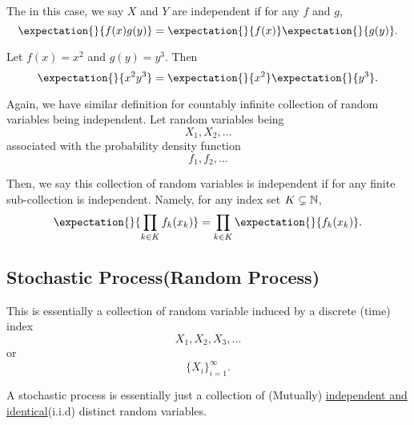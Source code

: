 The in this case, we say \(X\) and \(Y\) are independent if for any \(f\) and \(g\),
\[
	\expectation{}{f(x)g(y)} = \expectation{}{f(x)}\expectation{}{g(y)}.
\]
\begin{eg}
	Let \(f(x) = x^2\) and \(g(y) = y^3\). Then
	\[
		\expectation{}{x^2 y^3} = \expectation{}{x^2} \expectation{}{y^3}.
	\]
\end{eg}

Again, we have similar definition for countably infinite collection of random variables being independent. Let random variables being
\[
	X_1, X_2, \ldots
\]
associated with the probability density function
\[
	f_1, f_2, \ldots
\]

Then, we say this collection of random variables is independent if for any finite sub-collection is independent. Namely, for any index set \(K\subsetneq\mathbb{\MakeUppercase{N}}\),
\[
	\expectation{}{\prod\limits_{k\in K} f_k(x_k)} = \prod\limits_{k\in K} \expectation{}{f_k(x_k)}.
\]


\subsection{Stochastic Process(Random Process)}
This is essentially a collection of random variable induced by a discrete (time) index
\[
	X_1, X_2, X_3, \ldots
\]
or
\[
	\{X_i\}_{i = 1}^{\infty }.
\]

\begin{intuition}
	A stochastic process is essentially just a collection of (Mutually) \underline{independent and identical}(i.i.d) distinct random variables.
\end{intuition}

